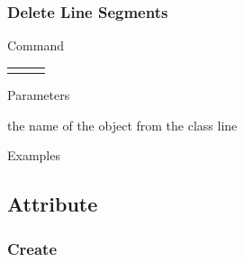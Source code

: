 \documentclass[9pt]{beamer}
\begin{document}
\begin{frame}[t] \frametitle{Delete Line Segments}

	\begin{block}{Command} 
		\begin{tabularx}{\textwidth}{@{}l@{}l@{}R}
			 &
			  	 & \InstrItem
		\end{tabularx}
	\end{block}

	\begin{block}{Parameters} \begin{itemize}
		   the name of the object from the class line
	\end{itemize} \end{block}

	\begin{block}{Examples}
	\end{block}

\end{frame}

\subsection{Attribute}

\subsubsection{Create}
\end{document}
